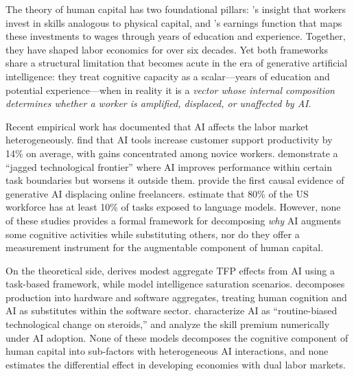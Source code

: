 \documentclass[11pt,a4paper]{article}
\theoremstyle{definition}
\begin{document}
The theory of human capital has two foundational pillars: \citet{becker1964human}'s insight that workers invest in skills analogous to physical capital, and \citet{mincer1974schooling}'s earnings function that maps these investments to wages through years of education and experience. Together, they have shaped labor economics for over six decades. Yet both frameworks share a structural limitation that becomes acute in the era of generative artificial intelligence: they treat cognitive capacity as a scalar---years of education and potential experience---when in reality it is a \textit{vector whose internal composition determines whether a worker is amplified, displaced, or unaffected by AI}.

Recent empirical work has documented that AI affects the labor market heterogeneously. \citet{brynjolfsson2025generative} find that AI tools increase customer support productivity by 14\% on average, with gains concentrated among novice workers. \citet{dellacqua2023jagged} demonstrate a ``jagged technological frontier'' where AI improves performance within certain task boundaries but worsens it outside them. \citet{hui2024shortterm} provide the first causal evidence of generative AI displacing online freelancers. \citet{eloundou2024gpts} estimate that 80\% of the US workforce has at least 10\% of tasks exposed to language models. However, none of these studies provides a formal framework for decomposing \textit{why} AI augments some cognitive activities while substituting others, nor do they offer a measurement instrument for the augmentable component of human capital.

On the theoretical side, \citet{acemoglu2024simple} derives modest aggregate TFP effects from AI using a task-based framework, while \citet{korinek2024scenarios} model intelligence saturation scenarios. \citet{growiec2024hardware} decomposes production into hardware and software aggregates, treating human cognition and AI as substitutes within the software sector. \citet{tyson2022automation} characterize AI as ``routine-biased technological change on steroids,'' and \citet{cheng2024skill} analyze the skill premium numerically under AI adoption. None of these models decomposes the cognitive component of human capital into sub-factors with heterogeneous AI interactions, and none estimates the differential effect in developing economies with dual labor markets.
\end{document}
